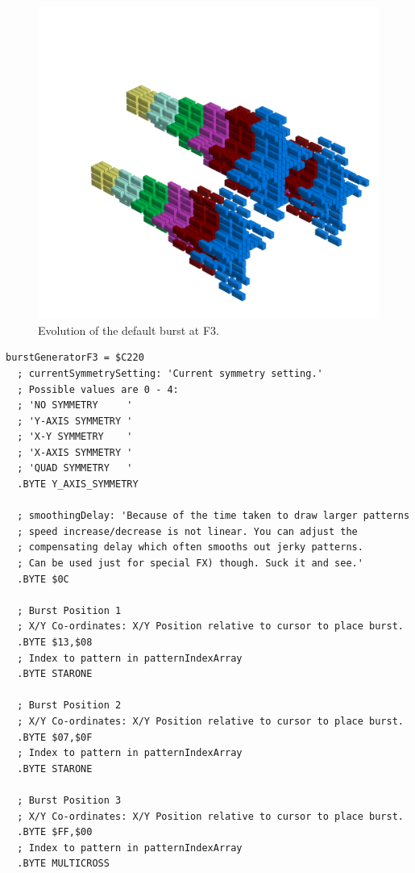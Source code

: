 \clearpage
\begin{figure}[H]
    \centering
    \begin{adjustbox}{width=12cm,center}
      \includegraphics[width=12cm]{src/patterns/bursts/pattern1-45.png}%
    \end{adjustbox}
\caption{Evolution of the default burst at F3.}
\end{figure}
\clearpage

\begin{lstlisting}[caption=Source code for the F3 Burst.]
burstGeneratorF3 = $C220
  ; currentSymmetrySetting: 'Current symmetry setting.'
  ; Possible values are 0 - 4:
  ; 'NO SYMMETRY     '
  ; 'Y-AXIS SYMMETRY '
  ; 'X-Y SYMMETRY    '
  ; 'X-AXIS SYMMETRY '
  ; 'QUAD SYMMETRY   '
  .BYTE Y_AXIS_SYMMETRY

  ; smoothingDelay: 'Because of the time taken to draw larger patterns
  ; speed increase/decrease is not linear. You can adjust the 
  ; compensating delay which often smooths out jerky patterns.
  ; Can be used just for special FX) though. Suck it and see.'
  .BYTE $0C

  ; Burst Position 1
  ; X/Y Co-ordinates: X/Y Position relative to cursor to place burst.
  .BYTE $13,$08
  ; Index to pattern in patternIndexArray
  .BYTE STARONE

  ; Burst Position 2
  ; X/Y Co-ordinates: X/Y Position relative to cursor to place burst.
  .BYTE $07,$0F
  ; Index to pattern in patternIndexArray
  .BYTE STARONE

  ; Burst Position 3
  ; X/Y Co-ordinates: X/Y Position relative to cursor to place burst.
  .BYTE $FF,$00
  ; Index to pattern in patternIndexArray
  .BYTE MULTICROSS

\end{lstlisting}

